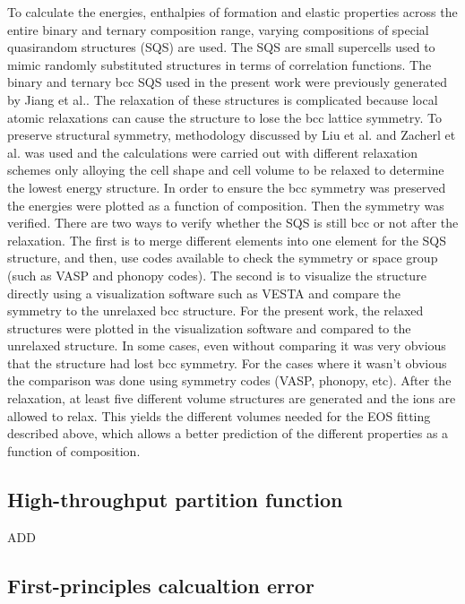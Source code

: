 To calculate the energies, enthalpies of formation and elastic properties across the entire binary and ternary composition range, varying compositions of special quasirandom structures (SQS) are used. The SQS are small supercells used to mimic randomly substituted structures in terms of correlation functions. The binary and ternary bcc SQS used in the present work were previously generated by Jiang et al.\cite{Jiang2004,Jiang2009}. The relaxation of these structures is complicated because local atomic relaxations can cause the structure to lose the bcc lattice symmetry. To preserve structural symmetry, methodology discussed by Liu et al. \cite{Liu2013} and Zacherl et al. \cite{Zacherl2012} was used and the calculations were carried out with different relaxation schemes only alloying the cell shape and cell volume to be relaxed to determine the lowest energy structure. In order to ensure the bcc symmetry was preserved the energies were plotted as a function of composition. Then the symmetry was verified. There are two ways to verify whether the SQS is still bcc or not after the relaxation. The first is to merge different elements into one element for the SQS structure, and then, use codes available to check the symmetry or space group (such as VASP and phonopy codes). The second is to visualize the structure directly using a visualization software such as VESTA and compare the symmetry to the unrelaxed bcc structure. For the present work, the relaxed structures were plotted in the visualization software and compared to the unrelaxed structure. In some cases, even without comparing it was very obvious that the structure had lost bcc symmetry. For the cases where it wasn't obvious the comparison was done using symmetry codes (VASP, phonopy, etc). After the relaxation, at least five different volume structures are generated and the ions are allowed to relax. This yields the different volumes needed for the EOS fitting described above, which allows a better prediction of the different properties as a function of composition. 

\subsection{High-throughput partition function}

ADD

\subsection{First-principles calcualtion error}

